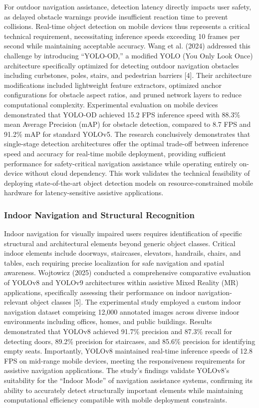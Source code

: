 \documentclass[a4paper]{report}
\begin{document}
For outdoor navigation assistance, detection latency directly impacts user safety, as delayed obstacle warnings provide insufficient reaction time to prevent collisions. Real-time object detection on mobile devices thus represents a critical technical requirement, necessitating inference speeds exceeding 10 frames per second while maintaining acceptable accuracy. Wang et al. (2024) addressed this challenge by introducing ``YOLO-OD,'' a modified YOLO (You Only Look Once) architecture specifically optimized for detecting outdoor navigation obstacles including curbstones, poles, stairs, and pedestrian barriers [4]. Their architecture modifications included lightweight feature extractors, optimized anchor configurations for obstacle aspect ratios, and pruned network layers to reduce computational complexity. Experimental evaluation on mobile devices demonstrated that YOLO-OD achieved 15.2 FPS inference speed with 88.3\% mean Average Precision (mAP) for obstacle detection, compared to 8.7 FPS and 91.2\% mAP for standard YOLOv5. The research conclusively demonstrates that single-stage detection architectures offer the optimal trade-off between inference speed and accuracy for real-time mobile deployment, providing sufficient performance for safety-critical navigation assistance while operating entirely on-device without cloud dependency. This work validates the technical feasibility of deploying state-of-the-art object detection models on resource-constrained mobile hardware for latency-sensitive assistive applications.

\subsubsection{Indoor Navigation and Structural Recognition}

Indoor navigation for visually impaired users requires identification of specific structural and architectural elements beyond generic object classes. Critical indoor elements include doorways, staircases, elevators, handrails, chairs, and tables, each requiring precise localization for safe navigation and spatial awareness. Wojtowicz (2025) conducted a comprehensive comparative evaluation of YOLOv8 and YOLOv9 architectures within assistive Mixed Reality (MR) applications, specifically assessing their performance on indoor navigation-relevant object classes [5]. The experimental study employed a custom indoor navigation dataset comprising 12,000 annotated images across diverse indoor environments including offices, homes, and public buildings. Results demonstrated that YOLOv8 achieved 91.7\% precision and 87.3\% recall for detecting doors, 89.2\% precision for staircases, and 85.6\% precision for identifying empty seats. Importantly, YOLOv8 maintained real-time inference speeds of 12.8 FPS on mid-range mobile devices, meeting the responsiveness requirements for assistive navigation applications. The study's findings validate YOLOv8's suitability for the ``Indoor Mode'' of navigation assistance systems, confirming its ability to accurately detect structurally important elements while maintaining computational efficiency compatible with mobile deployment constraints.
\end{document}
